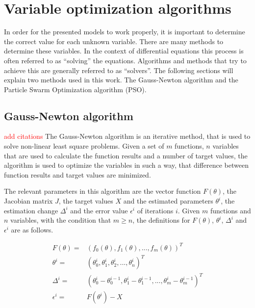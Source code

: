 
\section{Variable optimization algorithms}
In order for the presented models to work properly, it is important to determine the correct value for each unknown variable. There are many
methods to determine these variables. In the context of differential equations this process is often referred to as ``solving'' the equations.
Algorithms and methods that try to achieve this are generally referred to as ``solvers''.
The following sections will explain two methods used in this work. The Gauss-Newton algorithm and the Particle Swarm Optimization algorithm (PSO).


\subsection{Gauss-Newton algorithm}
\textcolor{red}{add citations}
\label{sec:Gauss}
The Gauss-Newton algorithm is an iterative method, that is used to solve non-linear least square problems. Given a set of $m$ functions, $n$
variables that are used to calculate the function results  and a number of target values, the algorithm is used to optimize the variables in
such a way, that difference between function results and target values are minimized.\newline

The relevant parameters in this algorithm are the vector function $F(\theta)$, the Jacobian matrix $J$, the target values $X$ and the
estimated parameters $\theta^{i}$, the estimation change $\Delta^{i}$ and the error value $\epsilon^{i}$ of iterations $i$. Given $m$
functions and $n$ variables, with the condition that $m \geq n$, the definitions for $F(\theta)$, $\theta^{i}$, $\Delta^{i}$ and
$\epsilon^{i}$ are as follows.

\begin{align}
	F(\theta) =& (f_0(\theta), f_1(\theta),...,f_m(\theta))^T \\
	\theta^{i} =& (\theta^{i}_0, \theta^{i}_1, \theta^{i}_2,...,\theta^{i}_n)^T \\
	\Delta^{i} =& (\theta^{i}_0 - \theta^{i-1}_0, \theta^{i}_1 - \theta^{i-1}_1, ..., \theta^{i}_m - \theta^{i-1}_m)^T \\ %
	\epsilon^{i} =& F(\theta^{i}) - X
\end{align}

